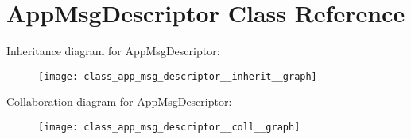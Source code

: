 \hypertarget{class_app_msg_descriptor}{}\section{App\+Msg\+Descriptor Class Reference}
\label{class_app_msg_descriptor}


Inheritance diagram for App\+Msg\+Descriptor\+:\nopagebreak
\begin{figure}[H]
\begin{center}
\leavevmode
\texttt{[image: class\_app\_msg\_descriptor\_\_inherit\_\_graph]}
\end{center}
\end{figure}


Collaboration diagram for App\+Msg\+Descriptor\+:\nopagebreak
\begin{figure}[H]
\begin{center}
\leavevmode
\texttt{[image: class\_app\_msg\_descriptor\_\_coll\_\_graph]}
\end{center}
\end{figure}
